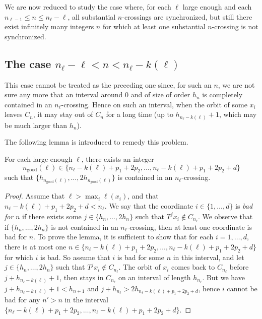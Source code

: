\documentclass[AHL,Unicode,longabstracts]{cedram}
\newcommand{\ngood}{n_{\text{good}}}
\begin{document}

We are now reduced to study the case where, for each $\ell$ large enough and each $n_{\ell-1}\le n \le n_\ell-\ell$, all substantial $n$-crossings are synchronized, but still there exist infinitely many integers $n$ for which at least one substantial $n$-crossing is not synchronized.


\subsection{The case \texorpdfstring{$n_\ell-\ell < n<n_\ell-k(\ell)$}{nl-l < n<nl-k(l)}}\label{sec:moredifficult}

This case cannot be treated as the preceding one since, for such an $n$, we are not sure any more that an interval around 0 and of size of order $h_n$ is completely contained in an $n_\ell$-crossing. Hence on such an interval, when the orbit of some $x_i$ leaves $C_n$, it may stay out of $C_n$ for a long time (up to $h_{n_\ell-k(\ell)}+1$, which may be much larger than $h_n$).

The following lemma is introduced to remedy this problem.
\begin{lemm}\label{lemma:n_good}
For each large enough $\ell$, there exists an integer
\[
\ngood(\ell)\in \{n_\ell - k(\ell)+ p_1+2p_2,\ldots,n_\ell - k(\ell)+ p_1+2p_2+d\}
\]
such that $\{h_{\ngood(\ell)},\ldots,2h_{\ngood(\ell)}\}$ is contained in an $n_\ell$-crossing.
\end{lemm}

\begin{proof}
Assume that $\ell>\max_i \ell(x_i)$, and that $n_\ell - k(\ell)+ p_1+2p_2+d<n_\ell$. We say that the coordinate $i\in\{1,\ldots,d\}$ is \emph{bad for} $n$ if there exists some $j\in \{h_n,\ldots,2h_n\}$ such that $T^j x_i\notin C_{n_\ell}$. We observe that if $\{h_n,\ldots,2h_n\}$ is not contained in an $n_\ell$-crossing, then at least one coordinate is bad for $n$. To prove the lemma, it is sufficient to show that for each $i=1,\ldots,d$, there is at most one $n\in \{n_\ell - k(\ell)+ p_1+2p_2,\ldots,n_\ell - k(\ell)+ p_1+2p_2+d\}$ for which $i$ is bad. So assume that $i$ is bad for some $n$ in this interval, and let $j\in \{h_n,\ldots,2h_n\}$ such that $T^j x_i\notin C_{n_\ell}$. The orbit of $x_i$ comes back to $C_{n_\ell}$ before $j+h_{n_\ell-k(\ell)}+1$, then stays in $C_{n_\ell}$ on an interval of length $h_{n_\ell}$. But we have $j+h_{n_\ell-k(\ell)}+1<h_{n+1}$ and $j+h_{n_\ell}>2 h_{n_\ell - k(\ell)+ p_1+2p_2+d}$, hence $i$ cannot be bad for any $n'>n$ in the interval $\{n_\ell - k(\ell)+ p_1+2p_2,\ldots,n_\ell - k(\ell)+ p_1+2p_2+d\}$.
\end{proof}
\end{document}
